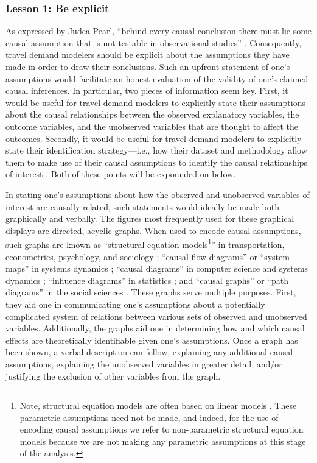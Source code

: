 \subsubsection{Lesson 1: Be explicit}
\label{sec:be-explicit}
As expressed by Judea Pearl, ``behind every causal conclusion there must lie some causal assumption that is not testable in observational studies'' \citep[p.99]{pearl2009statistics}. Consequently, travel demand modelers should be explicit about the assumptions they have made in order to draw their conclusions. Such an upfront statement of one's assumptions would facilitate an honest evaluation of the validity of one's claimed causal inferences. In particular, two pieces of information seem key. First, it would be useful for travel demand modelers to explicitly state their assumptions about the causal relationships between the observed explanatory variables, the outcome variables, and the unobserved variables that are thought to affect the outcomes. Secondly, it would be useful for travel demand modelers to explicitly state their identification strategy---i.e., how their dataset and methodology allow them to make use of their causal assumptions to identify the causal relationships of interest \citep{keele2015statistics}. Both of these points will be expounded on below.

In stating one's assumptions about how the observed and unobserved variables of interest are causally related, such statements would ideally be made both graphically and verbally. The figures most frequently used for these graphical displays are directed, acyclic graphs. When used to encode causal assumptions, such graphs are known as ``structural equation models\footnote{Note, structural equation models are often based on linear models \citep{golob_2003_structural}. These parametric assumptions need not be made, and indeed, for the use of encoding causal assumptions we refer to non-parametric structural equation models \citep{bollen_2013_eight} because we are not making any parametric assumptions at this stage of the analysis.}'' in transportation, econometrics, psychology, and sociology \citep{golob_2003_structural, bollen_2013_eight}; ``causal flow diagrams'' or ``system maps'' in systems dynamics \citep{abbas_1994_system, shepherd_2014_review};  ``causal diagrams'' in computer science and systems dynamics \citep{pearl2009causality, abbas_1994_system}; ``influence diagrams'' in statistics \citep{dawid2015statistical}; and ``causal graphs'' or ``path diagrams'' in the social sciences \citep{morgan2015counterfactuals}. These graphs serve multiple purposes. First, they aid one in communicating one's assumptions about a potentially complicated system of relations between various sets of observed and unobserved variables. Additionally, the graphs aid one in determining how and which causal effects are theoretically identifiable given one's assumptions. Once a graph has been shown, a verbal description can follow, explaining any additional causal assumptions, explaining the unobserved variables in greater detail, and/or justifying the exclusion of other variables from the graph.

